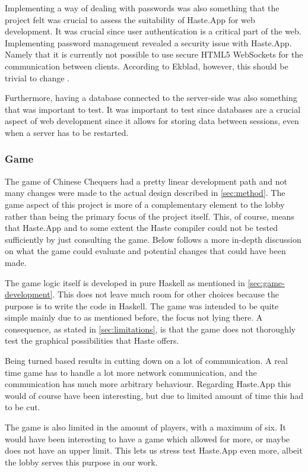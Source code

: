 \documentclass[a4paper]{article}
\begin{document}
Implementing a way of dealing with passwords was also something that the project felt was crucial to assess the suitability of Haste.App for web development. It was crucial since user authentication is a critical part of the web. Implementing password management revealed a security issue with Haste.App. Namely that it is currently not possible to use secure HTML5 WebSockets for the communication between clients. According to Ekblad, however, this should be trivial to change \cite{a-distributed-haskell-for-the-modern-web}.

Furthermore, having a database connected to the server-side was also something that was important to test. It was important to test since databases are a crucial aspect of web development since it allows for storing data between sessions, even when a server has to be restarted. 

\subsubsection{Game}
The game of Chinese Chequers had a pretty linear development path and not many changes were made to the actual design described in \cref{sec:method}. The game aspect of this project is more of a complementary element to the lobby rather than being the primary focus of the project itself. This, of course, means that Haste.App and to some extent the Haste compiler could not be tested sufficiently by just consulting the game. Below follows a more in-depth discussion on what the game could evaluate and potential changes that could have been made.


The game logic itself is developed in pure Haskell as mentioned in \cref{sec:game-development}. This does not leave much room for other choices because the purpose is to write the code in Haskell. The game was intended to be quite simple mainly due to as mentioned before, the focus not lying there. A consequence, as stated in \cref{sec:limitations}, is that the game does not thoroughly test the graphical possibilities that Haste offers.

Being turned based results in cutting down on a lot of communication. A real time game has to handle a lot more network communication, and the communication has much more arbitrary behaviour. Regarding Haste.App this would of course have been interesting, but due to limited amount of time this had to be cut.

The game is also limited in the amount of players, with a maximum of six. It would have been interesting to have a game which allowed for more, or maybe does not have an upper limit. This lets us stress test Haste.App even more, albeit the lobby serves this purpose in our work.
\end{document}
